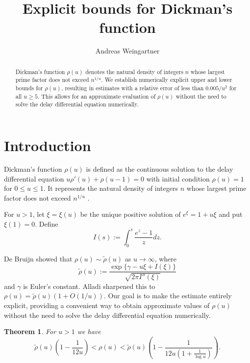 \documentclass[11pt]{amsart}
\newtheorem{theorem}{Theorem}
\begin{document}
\title{Explicit bounds for Dickman's function}



\author{Andreas Weingartner} 
\address{Department of Mathematics, Southern Utah University, 351 West University Boulevard, Cedar City, Utah 84720, USA} 

\begin{abstract}
Dickman's function $\rho(u)$ denotes the natural density of integers $n$ whose largest prime factor does not exceed $n^{1/u}$. 
We establish numerically explicit upper and lower bounds for $\rho(u)$, 
resulting in estimates with a relative error of less than $0.005/u^2$ for all $u\ge 5$.
This allows for an approximate evaluation of $\rho(u)$ without the need to solve the delay differential equation numerically.
\end{abstract}

\maketitle

\section{Introduction}
Dickman's function $\rho(u)$ is defined as the continuous solution to the delay differential equation
$u \rho'(u)+\rho(u-1)=0$ with initial condition $\rho(u)=1$ for $0\le u\le 1$. 
It represents the natural density of integers $n$ whose largest prime factor does not exceed $n^{1/u}$ \cite{Dick}.

For $u>1$, let $\xi=\xi(u)$ be the unique positive solution of $e^\xi=1+u\xi$ and put $\xi(1)=0$. 
Define 
$$
I(s):= \int_0^s \frac{e^z-1}{z}dz.
$$

De Bruijn \cite{BruRho} showed that $\rho(u)\sim \tilde{\rho}(u)$ as $u\to \infty$, where
$$
\tilde{\rho}(u) := \frac{\exp\{\gamma - u \xi + I(\xi)\}}{\sqrt{2 \pi I''(\xi)}}
$$
and $\gamma$ is Euler's constant.
Alladi \cite{All} sharpened this to $\rho(u)= \tilde{\rho}(u)(1+O(1/u))$.
Our goal is to make the estimate entirely explicit,
providing a convenient way to obtain approximate values of $\rho(u)$
without the need to solve the delay differential equation numerically.

\begin{theorem}\label{thm1}
For $u>1$ we have
$$
\tilde{\rho}(u) \left(1-\frac{1}{12u}\right)<\rho(u)< \tilde{\rho}(u) \left(1-\frac{1}{12u(1+\frac{1}{\log u})}\right) .
$$
\end{theorem}
\end{document}
